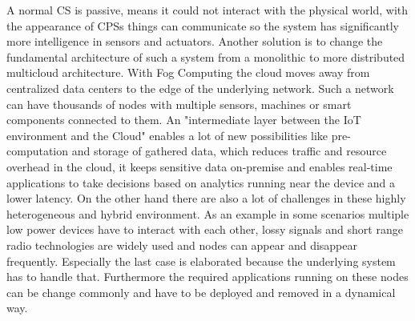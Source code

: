 A normal \ac{CS} is passive, means it could not interact with the physical world, with the appearance of \acp{CPS} things can communicate so the system has significantly more intelligence in sensors and actuators.\autocite[cf.][p. 1363 f.]{Poovendran:2010}
\newpage
Another solution is to change the fundamental architecture of such a system from a monolithic to more distributed multicloud architecture.
With Fog Computing the cloud moves away from centralized data centers to the edge of the underlying network.\autocite[cf.][p. 380]{Pahl:2015}
Such a network can have thousands of nodes with multiple sensors, machines or smart components connected to them.
An "intermediate layer between the IoT environment and the Cloud"\autocite[p.236]{Brito:2016} enables a lot of new possibilities like pre-computation and storage of gathered data, which reduces traffic and resource overhead in the cloud, it keeps sensitive data on-premise\autocite[cf.][p.236]{Brito:2016} and enables real-time applications to take decisions based on analytics running near the device and a lower latency.
On the other hand there are also a lot of challenges in these highly heterogeneous and hybrid environment.
As an example in some scenarios multiple low power devices have to interact with each other, lossy signals and short range radio technologies are widely used and nodes can appear and disappear frequently.\autocite[cf.][p. 325]{Yannuzzi:2014}
Especially the last case is elaborated because the underlying system has to handle that.
Furthermore the required applications running on these nodes can be change commonly and have to be deployed and removed in a dynamical way.

